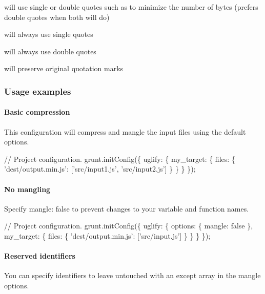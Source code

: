 \begin{DoxyItemize}
\item {} will use single or double quotes such as to minimize the number of bytes (prefers double quotes when both will do)
\item {} will always use single quotes
\item {} will always use double quotes
\item {} will preserve original quotation marks
\end{DoxyItemize}

\subsubsection*{Usage examples}

\paragraph*{Basic compression}

This configuration will compress and mangle the input files using the default options.


\begin{DoxyCode}
// Project configuration.
grunt.initConfig(\{
  uglify: \{
    my\_target: \{
      files: \{
        'dest/output.min.js': ['src/input1.js', 'src/input2.js']
      \}
    \}
  \}
\});
\end{DoxyCode}


\paragraph*{No mangling}

Specify {\ttfamily mangle\+: false} to prevent changes to your variable and function names.


\begin{DoxyCode}
// Project configuration.
grunt.initConfig(\{
  uglify: \{
    options: \{
      mangle: false
    \},
    my\_target: \{
      files: \{
        'dest/output.min.js': ['src/input.js']
      \}
    \}
  \}
\});
\end{DoxyCode}


\paragraph*{Reserved identifiers}

You can specify identifiers to leave untouched with an {\ttfamily except} array in the {\ttfamily mangle} options.


